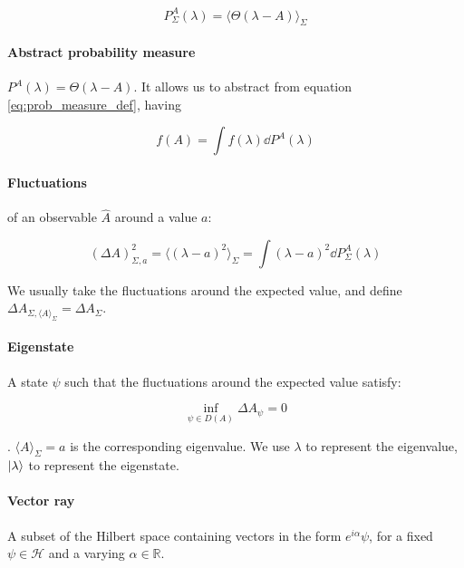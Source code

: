 \documentclass[main.tex]{subfiles}
\begin{document}
\begin{equation} \label{eq:prob_measure_def}
    P^A _\Sigma (\lambda) = \langle \Theta (\lambda - A) \rangle _\Sigma
\end{equation}

\paragraph{Abstract probability measure} $P^A (\lambda) = \Theta ( \lambda - A)$. It allows us to abstract from equation \eqref{eq:prob_measure_def}, having

\begin{equation}
    f(A) = \int f(\lambda) \dd{P}^A (\lambda)
\end{equation}

\paragraph{Fluctuations} of an observable $\hat{A}$ around a value $a$:

\begin{equation} \label{eq-fluctuations}
    (\Delta A)^2 _{\Sigma, a} = \langle (\lambda - a) ^2 \rangle _\Sigma = \int (\lambda-a)^2 \dd{P}^A_\Sigma (\lambda)
\end{equation}

We usually take the fluctuations around the expected value, and define $\Delta A _{\Sigma, \langle A\rangle_\Sigma} = \Delta A_\Sigma$.

\paragraph{Eigenstate} A state $\psi$ such that the fluctuations around the expected value satisfy:

\begin{equation}
    \inf _{\psi \in D(A)}\Delta A_\psi = 0
\end{equation}

. $\langle A \rangle _\Sigma = a$ is the corresponding eigenvalue.
We use $\lambda$ to represent the eigenvalue, $\ket{\lambda}$ to represent the eigenstate.

\paragraph{Vector ray} A subset of the Hilbert space containing vectors in the form $e^{i\alpha} \psi$, for a fixed $\psi \in \mathcal{H}$ and a varying $\alpha \in \mathbb{R}$.
\end{document}
